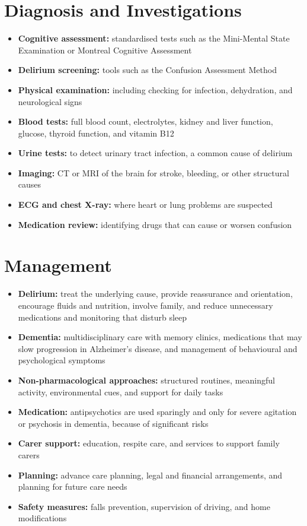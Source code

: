 \section*{Diagnosis and Investigations}
\begin{itemize}
    \item \textbf{Cognitive assessment:} standardised tests such as the Mini-Mental State Examination or Montreal Cognitive Assessment
    \item \textbf{Delirium screening:} tools such as the Confusion Assessment Method
    \item \textbf{Physical examination:} including checking for infection, dehydration, and neurological signs
    \item \textbf{Blood tests:} full blood count, electrolytes, kidney and liver function, glucose, thyroid function, and vitamin B12
    \item \textbf{Urine tests:} to detect urinary tract infection, a common cause of delirium
    \item \textbf{Imaging:} CT or MRI of the brain for stroke, bleeding, or other structural causes
    \item \textbf{ECG and chest X-ray:} where heart or lung problems are suspected
    \item \textbf{Medication review:} identifying drugs that can cause or worsen confusion
\end{itemize}

\section*{Management}
\begin{itemize}
    \item \textbf{Delirium:} treat the underlying cause, provide reassurance and orientation, encourage fluids and nutrition, involve family, and reduce unnecessary medications and monitoring that disturb sleep
    \item \textbf{Dementia:} multidisciplinary care with memory clinics, medications that may slow progression in Alzheimer's disease, and management of behavioural and psychological symptoms
    \item \textbf{Non-pharmacological approaches:} structured routines, meaningful activity, environmental cues, and support for daily tasks
    \item \textbf{Medication:} antipsychotics are used sparingly and only for severe agitation or psychosis in dementia, because of significant risks
    \item \textbf{Carer support:} education, respite care, and services to support family carers
    \item \textbf{Planning:} advance care planning, legal and financial arrangements, and planning for future care needs
    \item \textbf{Safety measures:} falls prevention, supervision of driving, and home modifications
\end{itemize}

